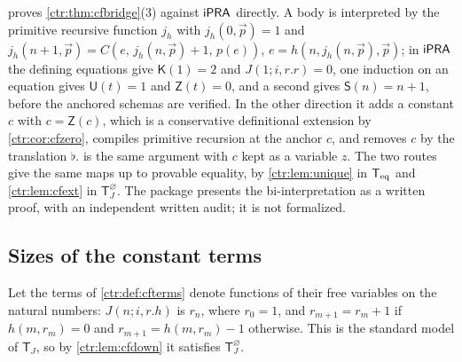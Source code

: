 \begin{remark}
 proves \cref{ctr:thm:cfbridge}(3) against $\mathsf{iPRA}$ directly. A body is
interpreted by the primitive recursive function $j_h$ with $j_h(0,\vec p)=1$ and
$j_h(n+1,\vec p)=C(e,\,j_h(n,\vec p)+1,\,p(e))$, $e=h(n,j_h(n,\vec p),\vec p)$; in $\mathsf{iPRA}$
the defining equations give $\mathsf K(1)=2$ and $J(1;i,r.r)=0$, one induction on an
equation gives $\mathsf U(t)=1$ and $\mathsf Z(t)=0$, and a second gives $\mathsf S(n)=n+1$,
before the anchored schemas are verified. In the other direction it adds a constant $c$
with $c=\mathsf Z(c)$, which is a conservative definitional extension by
\cref{ctr:cor:cfzero}, compiles primitive recursion at the anchor $c$, and removes $c$ by
the translation $\flat$.  is the same argument with $c$ kept as a
variable $z$. The two routes give the same maps up to provable equality, by
\cref{ctr:lem:unique} in $\mathsf{T}_{\mathrm{eq}}$ and \cref{ctr:lem:cfext} in $\mathsf T_J^{\varnothing}$. The
package presents the bi-interpretation as a written proof, with an independent written
audit; it is not formalized.
\end{remark}

\subsection{Sizes of the constant terms}

Let the terms of \cref{ctr:def:cfterms} denote functions of their free variables on the
natural numbers: $J(n;i,r.h)$ is $r_n$, where $r_0=1$, and $r_{m+1}=r_m+1$ if
$h(m,r_m)=0$ and $r_{m+1}=h(m,r_m)-1$ otherwise. This is the standard model of
$\mathsf T_J$, so by \cref{ctr:lem:cfdown} it satisfies $\mathsf T_J^{\varnothing}$.


